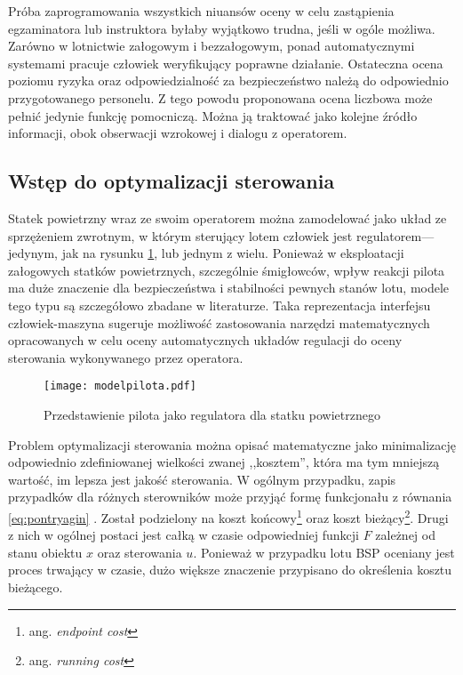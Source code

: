 Próba zaprogramowania wszystkich niuansów oceny w celu zastąpienia egzaminatora lub instruktora byłaby wyjątkowo trudna, jeśli w ogóle możliwa. Zarówno w lotnictwie załogowym i bezzałogowym, ponad automatycznymi systemami pracuje człowiek weryfikujący poprawne działanie. Ostateczna ocena poziomu ryzyka oraz odpowiedzialność za bezpieczeństwo należą do odpowiednio przygotowanego personelu. Z tego powodu proponowana ocena liczbowa może pełnić jedynie funkcję pomocniczą. Można ją traktować jako kolejne źródło informacji, obok obserwacji wzrokowej i dialogu z operatorem.

\subsection{Wstęp do optymalizacji sterowania}
\label{sec:ocena-teoria}
Statek powietrzny wraz ze swoim operatorem można zamodelować jako układ ze sprzężeniem zwrotnym, w którym sterujący lotem człowiek jest regulatorem---jedynym, jak na rysunku \ref{fig:modelpilota}, lub jednym z wielu. Ponieważ w eksploatacji załogowych statków powietrznych, szczególnie śmigłowców, wpływ reakcji pilota ma duże znaczenie dla bezpieczeństwa i stabilności pewnych stanów lotu, modele tego typu są szczegółowo zbadane w literaturze\cite{roskam1998}. Taka reprezentacja interfejsu człowiek-maszyna sugeruje możliwość zastosowania narzędzi matematycznych opracowanych w celu oceny automatycznych układów regulacji do oceny sterowania wykonywanego przez operatora.

\begin{figure}[!h]
    \centering \texttt{[image: modelpilota.pdf]}
    \caption{Przedstawienie pilota jako regulatora dla statku powietrznego}
    \label{fig:modelpilota}
\end{figure}

Problem optymalizacji sterowania można opisać matematyczne jako minimalizację odpowiednio zdefiniowanej wielkości zwanej ,,kosztem'', która ma tym mniejszą wartość, im lepsza jest jakość sterowania. W ogólnym przypadku, zapis przypadków dla różnych sterowników może przyjąć formę funkcjonału z równania \ref{eq:pontryagin} \cite{ross2009}. Został podzielony na koszt końcowy\footnote{ang. \emph{endpoint cost}} oraz koszt bieżący\footnote{ang. \emph{running cost}}. Drugi z nich w ogólnej postaci jest całką w czasie odpowiedniej funkcji $ F $ zależnej od stanu obiektu $ x $ oraz sterowania $ u $. Ponieważ w przypadku lotu BSP oceniany jest proces trwający w czasie, dużo większe znaczenie przypisano do określenia kosztu bieżącego.

